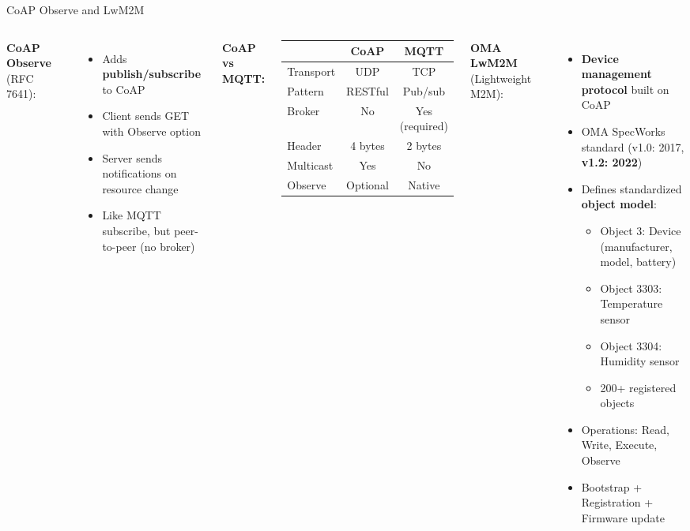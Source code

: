 \documentclass[aspectratio=169,11pt]{beamer}
\begin{document}
\begin{frame}{CoAP Observe and LwM2M}
    \begin{columns}
        \textbf{CoAP Observe} (RFC 7641):
        \begin{itemize}
            \item Adds \textbf{publish/subscribe} to CoAP
            \item Client sends GET with Observe option
            \item Server sends notifications on resource change
            \item Like MQTT subscribe, but peer-to-peer (no broker)
        \end{itemize}
        
        \vspace{0.3cm}
        \textbf{CoAP vs MQTT:}
        \begin{center}
        \footnotesize
        \begin{tabular}{lcc}
            \toprule
            & \textbf{CoAP} & \textbf{MQTT} \\
            \midrule
            Transport & UDP & TCP \\
            Pattern & RESTful & Pub/sub \\
            Broker & No & Yes (required) \\
            Header & 4 bytes & 2 bytes \\
            Multicast & Yes & No \\
            Observe & Optional & Native \\
            \bottomrule
        \end{tabular}
        \normalsize
        \end{center}
        
        \textbf{OMA LwM2M} (Lightweight M2M):
        \begin{itemize}
            \item \textbf{Device management protocol} built on CoAP
            \item OMA SpecWorks standard (v1.0: 2017, \textbf{v1.2: 2022})
            \item Defines standardized \textbf{object model}:
            \begin{itemize}
                \item Object 3: Device (manufacturer, model, battery)
                \item Object 3303: Temperature sensor
                \item Object 3304: Humidity sensor
                \item 200+ registered objects
            \end{itemize}
            \item Operations: Read, Write, Execute, Observe
            \item Bootstrap + Registration + Firmware update
        \end{itemize}
        

\end{columns}
\end{frame}
\end{document}
